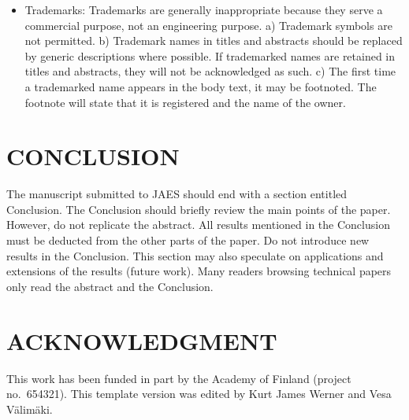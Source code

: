 \documentclass[fleqn]{jaes}
\begin{document}
\begin{itemize}
    \item Trademarks: Trademarks are generally inappropriate because they serve a commercial purpose, not an engineering purpose. a) Trademark symbols are not permitted. b) Trademark names in titles and abstracts should be replaced by generic descriptions where possible. If trademarked names are retained in titles and abstracts, they will not be acknowledged as such. c) The first time a trademarked name appears in the body text, it may be footnoted. The footnote will state that it is registered and the name of the owner.
\end{itemize}

\section{CONCLUSION}
The manuscript submitted to JAES should end with a section entitled Conclusion. The Conclusion should briefly review the main points of the paper. However, do not replicate the abstract. All results mentioned in the Conclusion must be deducted from the other parts of the paper. Do not introduce new results in the Conclusion. This section may also speculate on applications and extensions of the results (future work). Many readers browsing technical papers only read the abstract and the Conclusion.

\section{ACKNOWLEDGMENT}
This  work  has  been  funded  in  part  by  the  Academy of   Finland   (project no.~654321). This template version was edited by Kurt James Werner and Vesa V\"alim\"aki. 



\end{document}
